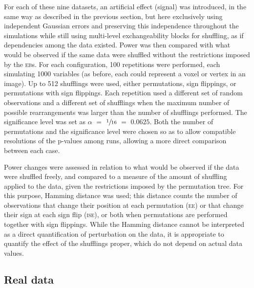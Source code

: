 For each of these nine datasets, an artificial effect (signal) was introduced, in the same way as described in the previous section, but here exclusively using independent Gaussian errors and preserving this independence throughout the simulations while still using multi-level exchangeability blocks for shuffling, as if dependencies among the data existed. Power was then compared with what would be observed if the same data were shuffled without the restrictions imposed by the \textsc{eb}s. For each configuration, 100 repetitions were performed, each simulating 1000 variables (as before, each could represent a voxel or vertex in an image). Up to 512 shufflings were used, either permutations, sign flippings, or permutations with sign flippings. Each repetition used a different set of random observations and a different set of shufflings when the maximum number of possible rearrangements was larger than the number of shufflings performed. The significance level was set as $\alpha$ $=$ $\sfrac{1}{16}$ $=$ $0.0625$. Both the number of permutations and the significance level were chosen so as to allow compatible resolutions of the p-values among runs, allowing a more direct comparison between each case.

Power changes were assessed in relation to what would be observed if the data were shuffled freely, and compared to a measure of the amount of shuffling applied to the data, given the restrictions imposed by the permutation tree. For this purpose, Hamming distance \citep{Hamming1950} was used; this distance counts the number of observations that change their position at each permutation (\textsc{ee}) or that change their sign at each sign flip (\textsc{ise}), or both when permutations are performed together with sign flippings. While the Hamming distance cannot be interpreted as a direct quantification of perturbation on the data, it is appropriate to quantify the effect of the shufflings proper, which do not depend on actual data values.

\subsection{Real data}
\label{sec:ptree:meth_hcp}

